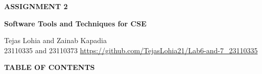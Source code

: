 \documentclass[12pt, a4paper]{report}
\begin{document}
\begin{titlepage}
    \centering
    \vspace*{\fill} %
    
    {\color{customOrange}\Huge\bfseries ASSIGNMENT 2}
    
    \vspace{0.75cm} %
    
    {\Large\bfseries Software Tools and Techniques for CSE}
    
    \vfill %
    
    \colorbox{customOrange}{%
        \parbox{1.0\textwidth}{%
            \centering
            \vspace{1em} %
            {\Large\color{white} Tejas Lohia and Zainab Kapadia} \\[0.5em] %
            {\large\color{white} 23110335 and 23110373} %
            {\large\color{white} \mbox{\url{https://github.com/TejasLohia21/Lab6-and-7_23110335}}} %
            \vspace{1em} %
        }
    }
    
    \vspace*{\fill} %
\end{titlepage}




\renewcommand{\cfttoctitlefont}{\hfill} 
\renewcommand{\cftaftertoctitle}{\hfill}
{\noindent\colorbox{customOrange}{\parbox{\textwidth}{\vspace{0.4em}\Large\bfseries\color{white}\hspace{1em}TABLE OF CONTENTS\vspace{0.4em}}}}

\tableofcontents 
\end{document}
